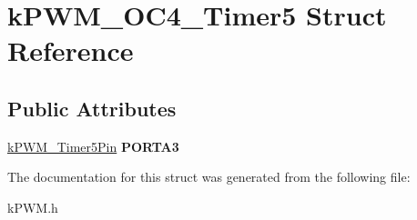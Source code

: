 \hypertarget{structkPWM__OC4__Timer5}{}\section{k\+P\+W\+M\+\_\+\+O\+C4\+\_\+\+Timer5 Struct Reference}
\label{structkPWM__OC4__Timer5}
\subsection*{Public Attributes}
\begin{DoxyCompactItemize}
\item 
\hyperlink{structkPWM__Timer5Pin}{k\+P\+W\+M\+\_\+\+Timer5\+Pin} {\bfseries P\+O\+R\+T\+A3}\hypertarget{structkPWM__OC4__Timer5_a14f0298a5755d50faa25dd39eceef8c2}{}\label{structkPWM__OC4__Timer5_a14f0298a5755d50faa25dd39eceef8c2}

\end{DoxyCompactItemize}


The documentation for this struct was generated from the following file\+:\begin{DoxyCompactItemize}
\item 
k\+P\+W\+M.\+h\end{DoxyCompactItemize}
